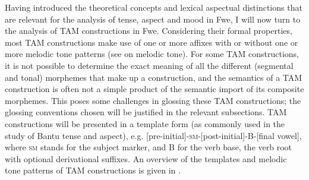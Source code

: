 Having introduced the theoretical concepts and lexical aspectual distinctions that are relevant for the analysis of tense, aspect and mood in Fwe, I will now turn to the analysis of TAM constructions in Fwe. Considering their formal properties, most TAM constructions make use of one or more affixes with or without one or more melodic tone patterns (see  on melodic tone). For some TAM constructions, it is not possible to determine the exact meaning of all the different (segmental and tonal) morphemes that make up a construction, and the semantics of a TAM construction is often not a simple product of the semantic import of its composite morphemes. This poses some challenges in glossing these TAM constructions; the glossing conventions chosen will be justified in the relevant subsections. TAM constructions will be presented in a template form (as commonly used in the study of Bantu tense and aspect), e.g. [pre-initial]-\textsc{sm}-[post-initial]-B-[final vowel], where \textsc{sm} stands for the subject marker, and B for the verb base, the verb root with optional derivational suffixes. An overview of the templates and melodic tone patterns of TAM constructions is given in .

